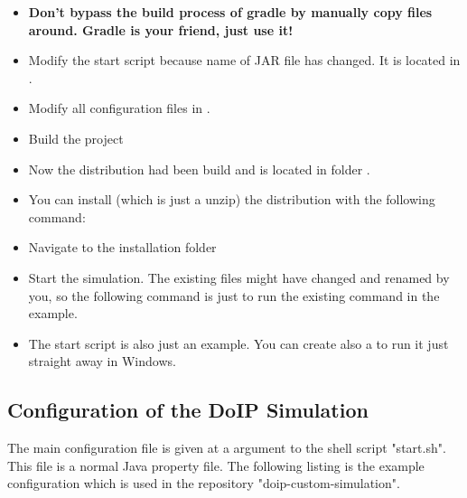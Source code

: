\documentclass[a4paper]{doipdoc}
\begin{document}
\begin{itemize}
			\item \textbf{Don't bypass the build process of gradle by manually
			copy files around. Gradle is your friend, just use it!}

			\item Modify the start script because name of JAR file has changed.
			It is located in .

			\item Modify all configuration files in .

			\item Build the project


			\item Now the distribution had been build and is located in folder
				. 

			\item You can install (which is just a unzip) the distribution 
				with the following command:


			\item Navigate to the installation folder


			\item Start the simulation. The existing files might have 
				changed and renamed by you, so the following command
				is just to run the existing command in the example.


			\item The start script  is also just an example.
				You can create also a  to run it just
				straight away in Windows.

		\end{itemize}

	\subsection{Configuration of the DoIP Simulation}
		
		The main configuration file is given at a argument to the shell script
		"start.sh". This file is a normal Java property file. The following 
		listing is the example configuration which is used in the repository
		"doip-custom-simulation".
\end{document}
